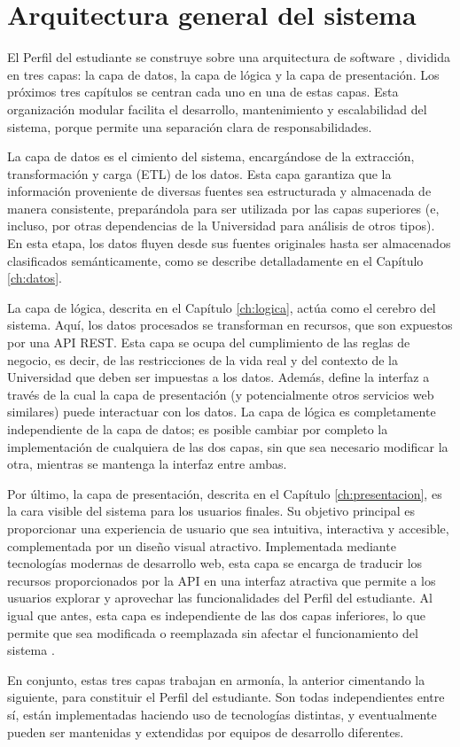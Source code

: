 \section{Arquitectura general del sistema}

El Perfil del estudiante se construye sobre una arquitectura de software , dividida en tres capas: la capa de datos, la capa de lógica y la capa de presentación. Los próximos tres capítulos se centran cada uno en una de estas capas. Esta organización modular facilita el desarrollo, mantenimiento y escalabilidad del sistema, porque permite una separación clara de responsabilidades.

La capa de datos es el cimiento del sistema, encargándose de la extracción, transformación y carga (\gls{ETL}) de los datos. Esta capa garantiza que la información proveniente de diversas fuentes sea estructurada y almacenada de manera consistente, preparándola para ser utilizada por las capas superiores (e, incluso, por otras dependencias de la Universidad para análisis de otros tipos). En esta etapa, los datos fluyen desde sus fuentes originales hasta ser almacenados clasificados semánticamente, como se describe detalladamente en el Capítulo \ref{ch:datos}.

La capa de lógica, descrita en el Capítulo \ref{ch:logica}, actúa como el cerebro del sistema. Aquí, los datos procesados se transforman en recursos, que son expuestos por una \gls{API REST}. Esta capa se ocupa del cumplimiento de las reglas de negocio, es decir, de las restricciones de la vida real y del contexto de la Universidad que deben ser impuestas a los datos. Además, define la interfaz a través de la cual la capa de presentación (y potencialmente otros servicios web similares) puede interactuar con los datos. La capa de lógica es completamente independiente de la capa de datos; es posible cambiar por completo la implementación de cualquiera de las dos capas, sin que sea necesario modificar la otra, mientras se mantenga la interfaz entre ambas.

Por último, la capa de presentación, descrita en el Capítulo \ref{ch:presentacion}, es la cara visible del sistema para los usuarios finales. Su objetivo principal es proporcionar una experiencia de usuario que sea intuitiva, interactiva y accesible, complementada por un diseño visual atractivo. Implementada mediante tecnologías modernas de desarrollo web, esta capa se encarga de traducir los recursos proporcionados por la API en una interfaz atractiva que permite a los usuarios explorar y aprovechar las funcionalidades del Perfil del estudiante. Al igual que antes, esta capa es independiente de las dos capas inferiores, lo que permite que sea modificada o reemplazada sin afectar el funcionamiento del sistema .

En conjunto, estas tres capas trabajan en armonía, la anterior cimentando la siguiente, para constituir el Perfil del estudiante. Son todas independientes entre sí, están implementadas haciendo uso de tecnologías distintas, y eventualmente pueden ser mantenidas y extendidas por equipos de desarrollo diferentes.